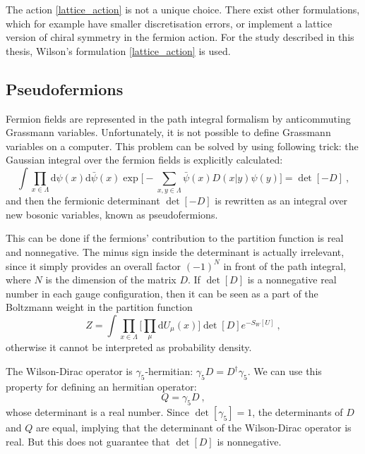 The action \ref{lattice_action} is not  a unique choice. There exist other formulations, which for example have smaller discretisation errors, or implement a lattice version of chiral symmetry in the fermion action. For the study described in this thesis, Wilson's formulation \ref{lattice_action} is used.



\subsection{Pseudofermions}

Fermion fields are represented in the path integral formalism by anticommuting Grassmann variables. Unfortunately, it is not possible to define Grassmann variables on a computer. This problem can be solved by using following trick: the Gaussian integral over the fermion fields is explicitly calculated:
\begin{equation}
\int \prod_{x \in \Lambda}  \mathrm{d} \psi(x) \mathrm{d} \bar \psi(x) \exp \biggl[-\sum_{x,y \in \Lambda} \bar\psi(x) D(x \vert y)\psi(y) \biggr] = \det[-D] \: ,
\end{equation}
%
and then the fermionic determinant $\det[-D]$ is rewritten as an integral over new bosonic variables, known as pseudofermions. 

This can be done if the fermions' contribution to the partition function is real and nonnegative.
The minus sign inside the determinant is actually irrelevant, since it simply provides an overall factor $(-1)^N$ in front of the path integral, where $N$ is the dimension of the matrix $D$. If $\det[D]$ is a nonnegative real number in each gauge configuration, then it can  be seen as a part of the Boltzmann weight in the partition function
\begin{equation}
Z = \int \prod_{x \in \Lambda} \biggl[ \prod_{\mu} \mathrm{d} U_{\mu}(x) \biggr] \det[D] e^{-S_W[U]} \: ,
\end{equation}
%
otherwise it cannot be interpreted as probability density. 

The Wilson-Dirac operator is $\gamma_5$-hermitian: $\gamma_5 D = D^{\dagger} \gamma_5$. We  can use this property for defining an hermitian operator:
\begin{equation}
Q = \gamma_5 D \: ,
\end{equation}
% 
 whose determinant is a real number. Since $\det[ \gamma_5] = 1$,  the determinants of $D$ and $Q$ are equal, implying that the determinant of the Wilson-Dirac operator is real. But this does not guarantee that $\det[D]$ is nonnegative.

